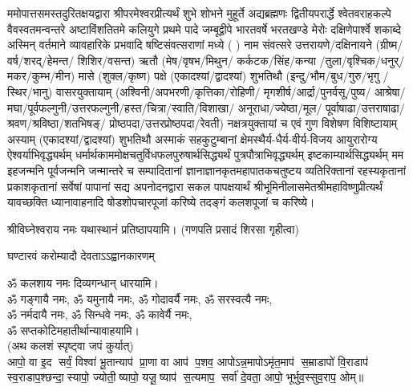 
ममोपात्तसमस्तदुरितक्षयद्वारा श्रीपरमेश्वरप्रीत्यर्थं शुभे शोभने मुहूर्ते अद्यब्रह्मणः
द्वितीयपरार्द्धे श्वेतवराहकल्पे वैवस्वतमन्वन्तरे अष्टाविंशतितमे कलियुगे प्रथमे पादे
जम्बूद्वीपे भारतवर्षे भरतखण्डे मेरोः दक्षिणेपार्श्वे शकाब्दे अस्मिन् वर्तमाने व्यावहारिके
 प्रभवादि षष्टिसंवत्सराणां मध्ये (	) नाम संवत्सरे उत्तरायणे/दक्षिनायने 
(ग्रीष्म/वर्ष/शरद्/हेमन्त/ शिशिर/वसन्त) ऋतौ  (मेष/वृषभ/मिथुन/
कर्कटक/सिंह/कन्या /तुला/वृश्चिक/धनुर्/मकर/कुम्भ/मीन) मासे 
(शुक्ल/कृष्ण) पक्षे (एकादश्यां/द्वादश्यां) शुभतिथौ
(इन्दु/भौम/बुध/गुरु/भृगु /स्थिर/भानु) वासरयुक्तायाम्
(अश्विनी/अपभरणी/कृत्तिका/रोहिणी/ मृगशीर्ष/आर्द्रा/पुनर्वसू/पुष्य/
आश्रेषा/मघा/पूर्वफल्गुनी/उत्तर\-फल्गुनी/हस्त/चित्रा/स्वाति/विशाखा/
अनूराधा/ज्येष्ठा/मूल/ पूर्वाषाढा/उत्तराषाढा/श्रवण/श्रविष्ठा/शतभिषङ्/
प्रोष्ठपदा/उत्तर\-प्रोष्ठपदा/रेवती) नक्षत्रयुक्तायां च एवं गुण विशेषण विशिष्टायाम्
अस्याम् (एकादश्यां/द्वादश्यां) शुभतिथौ 
अस्माकं सहकुटुम्बानां क्षेमस्थैर्य-धैर्य-वीर्य-विजय आयुरारोग्य ऐश्वर्याभिवृद्ध्यर्थम्
 धर्मार्थकाममोक्ष\-चतुर्विधफलपुरुषार्थसिद्ध्यर्थं पुत्रपौत्राभिवृद्ध्यर्थम् इष्टकाम्यार्थसिद्ध्यर्थम्
मम इहजन्मनि पूर्वजन्मनि जन्मान्तरे च सम्पादितानां ज्ञानाज्ञानकृतमहा\-पातकचतुष्टय
व्यतिरिक्तानां रहस्यकृतानां प्रकाशकृतानां सर्वेषां पापानां सद्य अपनोदनद्वारा सकल 
पापक्षयार्थं श्रीभूमिनीलासमेतश्रीमहाविष्णुप्रीत्यर्थं यावच्छक्ति ध्यानावाहनादि 
षोडशोपचारपूजां करिष्ये तदङ्गं कलशपूजां च करिष्ये।


श्रीविघ्नेश्वराय नमः यथास्थानं प्रतिष्ठापयामि।
(गणपति प्रसादं शिरसा गृहीत्वा)


{घण्टारवं करोम्यादौ देवताऽऽह्वानकारणम्}

ॐ कलशाय नमः दिव्यगन्धान् धारयामि।\\
ॐ गङ्गायै नमः, ॐ यमुनायै नमः, ॐ गोदावर्यै नमः,  ॐ सरस्वत्यै नमः,\\ ॐ नर्मदायै नमः, ॐ सिन्धवे नमः, ॐ कावेर्यै नमः,\\
 ॐ सप्तकोटिमहातीर्थान्यावाहयामि। \\

(अथ कलशं स्पृष्ट्वा जपं कुर्यात्) \\
आपो॒ वा इ॒द सर्वं॒ विश्वा॑ भू॒तान्याप॑ प्रा॒णा वा आप॑ प॒शव॒ आपोऽन्न॒मापोऽमृ॑त॒माप॑ स॒म्राडापो॑ वि॒राडाप॑ स्व॒राडाप॒श्छन्दा॒स्यापो॒ ज्योती॒ष्यापो॒ यजू॒ष्याप॑ स॒त्यमाप॒ सर्वा॑ दे॒वता॒ आपो॒ भूर्भुव॒स्सुव॒राप॒ ओम्॥\\
 
